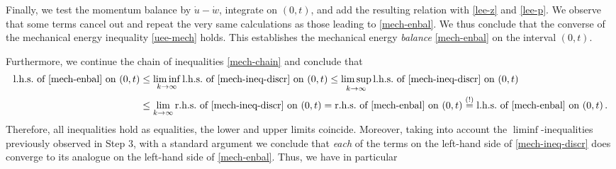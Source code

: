 \documentclass[a4paper,10pt,reqno]{amsart}
\numberwithin{equation}{section}
\numberwithin{equation}{section}
\begin{document}
 Finally, we test the momentum balance by $\dot{u}-\dot{w}$, integrate 
 on $(0,t)$,  and add the resulting relation with \eqref{lee-z} and \eqref{lee-p}. We  observe that 
 some terms cancel out and repeat the very  same calculations as those leading to \eqref{mech-enbal}. 
 We thus conclude that the converse of the  mechanical energy inequality \eqref{uee-mech} holds.
 This establishes  the mechanical energy \emph{balance}  \eqref{mech-enbal} on the interval $(0,t)$. 
 \par
 Furthermore, we continue the chain of inequalities \eqref{mech-chain}  and conclude that 
\[
    \begin{aligned}
    \text{l.h.s.\ of \eqref{mech-enbal} on $(0,t)$} &  \leq 
    \liminf_{k\to\infty}  \text{l.h.s.\ of \eqref{mech-ineq-discr} on $(0,t)$} 
    \leq 
     \limsup_{k\to\infty}  \text{l.h.s.\ of \eqref{mech-ineq-discr} on $(0,t)$} 
     \\ & 
    \leq  \lim_{k\to\infty}  \text{r.h.s.\ of \eqref{mech-ineq-discr} on $(0,t)$} 
    =  \text{r.h.s.\ of \eqref{mech-enbal} on $(0,t)$} 
    \stackrel{(!)}{=}  \text{l.h.s.\ of \eqref{mech-enbal} on $(0,t)$}\,.
    \end{aligned}
    \]
    Therefore, all inequalities hold as equalities, the lower and upper limits coincide. Moreover,
     taking into account the $\liminf$-inequalities previously observed in Step $3$, 
     with a standard argument  
    we conclude  that \emph{each} of the terms on the left-hand side  of 
\eqref{mech-ineq-discr} does converge to its analogue  on the left-hand side of \eqref{mech-enbal}.
Thus, we have  in particular
\end{document}
